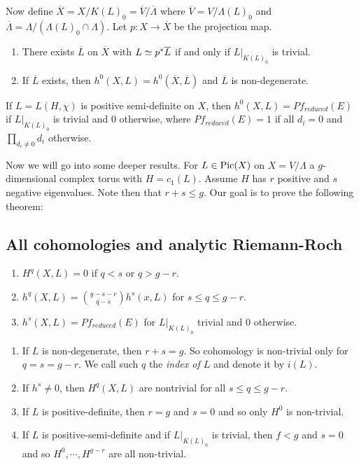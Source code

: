 Now define $\overline{X}=X/K(L)_0=\overline{V}/\overline{\Lambda}$ where $\overline{V}=V/\Lambda(L)_0$ and $\overline{\Lambda}=\Lambda/(\Lambda(L)_0\cap \Lambda)$. Let $p:X\to \overline{X}$ be the projection map.

\begin{lemma}
\noindent
\begin{enumerate}
\item There exists $\overline{L}$ on $\overline{X}$ with $L\simeq p^* \overline{L}$ if and only if $L|_{K(L)_0}$ is trivial.
\item If $\overline{L}$ exists, then $h^0(X,L)=h^0(\overline{X},\overline{L})$ and $\overline{L}$ is non-degenerate. 
\end{enumerate}
\end{lemma}

\begin{theorem}
If $L=L(H,\chi)$ is positive semi-definite on $X$, then $h^0(X,L)=Pf_{reduced}(E)$ if $L|_{K(L)_0}$ is trivial and $0$ otherwise, where $Pf_{reduced}(E)=1$ if all $d_i=0$ and $\prod_{d_i\not= 0}d_i$ otherwise.
\end{theorem}

Now we will go into some deeper results. For $L\in \operatorname{Pic}(X)$ on $X=V/\Lambda$ a $g$-dimensional complex torus with $H=c_1(L)$. Assume $H$ has $r$ positive and $s$ negative eigenvalues. Note then that $r+s\leq g$. Our goal is to prove the following theorem:

\subsection{All cohomologies and analytic Riemann-Roch}

\begin{theorem}
\noindent
\begin{enumerate}
\item $H^q(X,L)=0$ if $q<s$ or $q>g-r$.  
\item $h^q(X,L)=\binom{g-s-r}{q-s}h^s(x,L)$ for $s\leq q\leq g-r$.
\item $h^s(X,L)=Pf_{reduced}(E)$ for $L|_{K(L)_0}$ trivial and $0$ otherwise.
\end{enumerate}
\end{theorem}

\begin{corollary}
\noindent
\begin{enumerate}
\item If $L$ is non-degenerate, then $r+s=g$. So cohomology is non-trivial only for $q=s=g-r$. We call such $q$ the \emph{index of $L$} and denote it by $i(L)$.

\item If $h^s\not=0$, then $H^q(X,L)$ are nontrivial for all $s\leq q\leq g-r$.
\item If $L$ is positive-definite, then $r=g$ and $s=0$ and so only $H^0$ is non-trivial.
\item If $L$ is positive-semi-definite and if $L|_{K(L)_0}$ is trivial, then $f<g$ and $s=0$ and so $H^0,\cdots,H^{g-r}$ are all non-trivial.
\end{enumerate}
\end{corollary}

